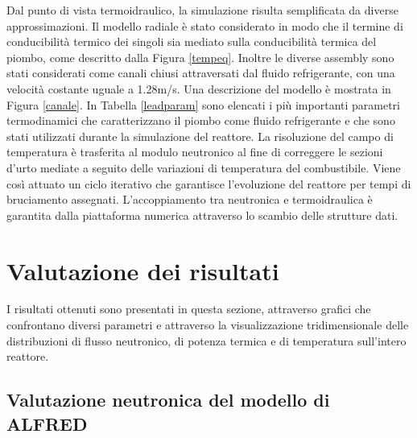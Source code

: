 Dal punto di vista termoidraulico, la simulazione risulta 
semplificata da diverse approssimazioni.
Il modello radiale è stato considerato in 
modo 
che il termine di conducibilità
termico dei singoli sia mediato sulla conducibilità termica del piombo, come 
descritto dalla Figura \ref{tempeq}.
Inoltre le diverse assembly sono stati considerati come canali chiusi attraversati 
dal 
fluido refrigerante, con una velocità costante uguale
a 1.28m/s. Una descrizione del modello è mostrata in Figura \ref{canale}.
In Tabella \ref{leadparam} sono elencati i più importanti parametri 
termodinamici che caratterizzano il piombo come fluido refrigerante e che
sono stati utilizzati durante la simulazione del reattore.
La risoluzione del campo di temperatura è trasferita al modulo neutronico al 
fine di correggere le sezioni d'urto mediate 
a seguito delle variazioni di temperatura del combustibile.
Viene così attuato un ciclo iterativo che garantisce l'evoluzione del reattore 
per tempi di bruciamento assegnati. L'accoppiamento tra neutronica e termoidraulica
è garantita dalla piattaforma numerica attraverso lo scambio delle strutture dati.


\section{Valutazione dei risultati}
I risultati ottenuti sono presentati in questa sezione, attraverso grafici che confrontano
diversi parametri e attraverso la visualizzazione tridimensionale delle distribuzioni di flusso neutronico, di potenza termica 
e di temperatura sull'intero reattore.

\subsection{Valutazione neutronica del modello di ALFRED}

